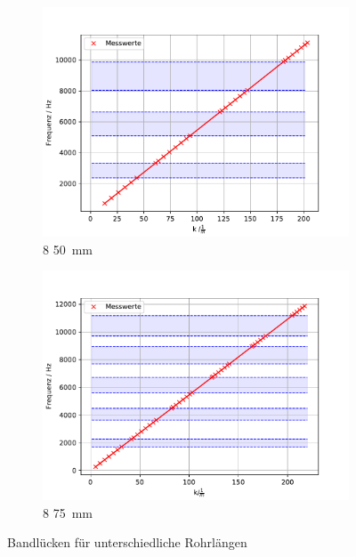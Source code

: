 \begin{figure}
 \centering
 \begin{subfigure}{0.48\textwidth}
  \centering
  \includegraphics[width=1\textwidth]{bla.pdf}
  \caption{8 \cdot \SI{50}{mm}}
  \label{fig.Aufgabe5}
 \end{subfigure}
 \begin{subfigure}{0.48\textwidth}
  \centering
  \includegraphics[width=1\textwidth]{bla75.pdf}
  \caption{8 \cdot \SI{75}{mm}}
  \label{fig.Aufgabe575}
 \end{subfigure}
 \caption{Bandlücken für unterschiedliche Rohrlängen}
\end{figure}

